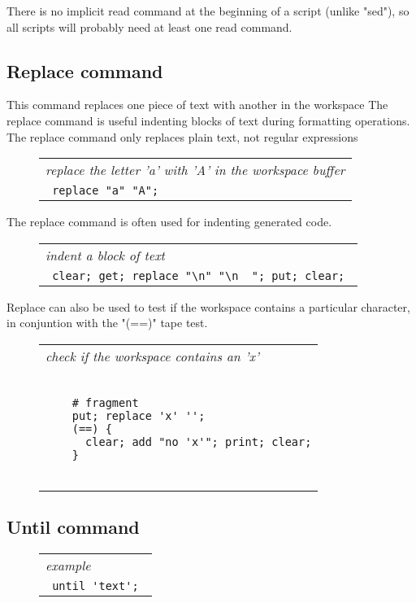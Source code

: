 \documentclass[a4paper,12pt]{article}
\begin{document}
  There is no implicit read command at the beginning of a script
  (unlike "sed"), so all scripts will probably need at least one
  read command.

\subsection{Replace command}

 This command replaces one piece of text with another in the workspace
 The replace command is useful indenting blocks of text during formatting
 operations. The replace command only replaces plain text, not
 regular expressions
 \begin{figure}
 \begin{tabular}{ l }
 \emph{ replace the letter 'a' with 'A' in the workspace buffer } \\ 
 \verb| replace "a" "A"; |
 \end{tabular} 
 \end{figure}

  The replace command is often used for indenting generated code.
 \begin{figure}
 \begin{tabular}{ l }
 \emph{ indent a block of text } \\ 
 \verb| clear; get; replace "\n" "\n  "; put; clear; |
 \end{tabular} 
 \end{figure}

  Replace can also be used to test if the workspace contains a particular
  character, in conjuntion with the "(==)" tape test.
 \begin{figure}
 \begin{tabular}{ l }
 \emph{ check if the workspace contains an 'x'  } \\ 
 \begin{lstlisting}[breaklines] 

    # fragment 
    put; replace 'x' ''; 
    (==) {
      clear; add "no 'x'"; print; clear;
    } 
  
 \end{lstlisting} 
 \end{tabular} 

 \end{figure}

\subsection{Until command}
 \begin{figure}
 \begin{tabular}{ l }
 \emph{ example } \\ 
 \verb| until 'text'; |
 \end{tabular} 
 \end{figure}
\end{document}
